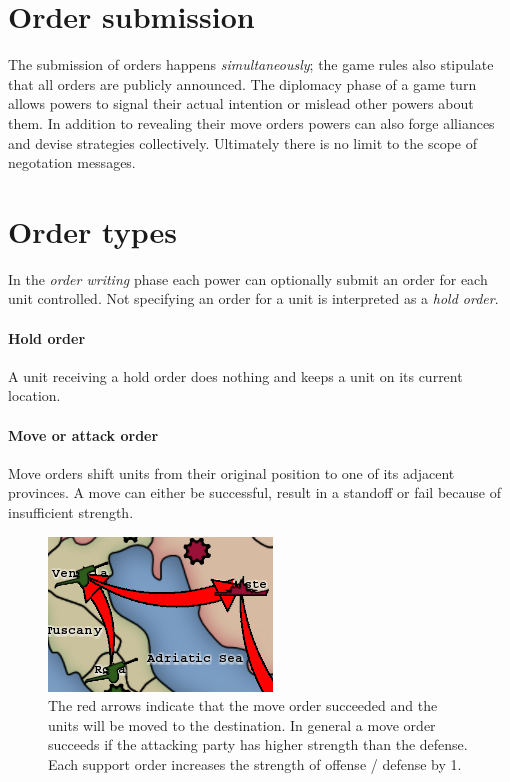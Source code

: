 \documentclass[pdftex,11pt,a4paper]{report}
\begin{document}
\section{Order submission}

The submission of orders happens \textit{simultaneously}; the game
rules also stipulate that all orders are publicly announced. The diplomacy
phase of a game turn allows powers to signal their actual intention or
mislead other powers about them. In addition to revealing their move
orders powers can also forge alliances and devise strategies
collectively. Ultimately there is no limit to the scope of negotation
messages.

\section{Order types}

In the \textit{order writing} phase each power can optionally submit
an order for each unit controlled. Not specifying an order for a 
unit is interpreted as a \textit{hold order}. 

\paragraph{Hold order}
A unit receiving a hold order does nothing and keeps a unit on its 
current location. 

\paragraph{Move or attack order} 
Move orders shift units from their original position to one of its
adjacent provinces. A move can either be successful, result in a
standoff or fail because of insufficient strength. 

\begin{figure}
\includegraphics[scale=0.75]{./screenshots/Move0.png} \\[1cm] 

The red arrows indicate that the move order succeeded and the units
will be moved to the destination. In general a move order succeeds
if the attacking party has higher strength than the defense. Each 
support order increases the strength of offense / defense by 1.

\end{figure}
\end{document}
